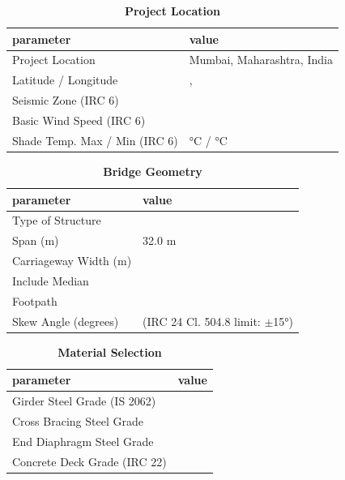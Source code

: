 \documentclass[12pt,a4paper]{report}
\numberwithin{table}{chapter}
\numberwithin{figure}{chapter}
\begin{document}
\begin{table}[H]
\caption{\textbf{Project Location}}
\label{subsec:project-location}
\begin{tabular}{|L{5.5cm}|L{8.5cm}|}
\hline
\textbf{parameter} & \textbf{value} \\
\hline
\textnormal{Project Location} & Mumbai, Maharashtra, India \\
\hline
\textnormal{Latitude / Longitude} & ,  \\
\hline
\textnormal{Seismic Zone (IRC 6)} &  \\
\hline
\textnormal{Basic Wind Speed (IRC 6)} &  \\
\hline
\textnormal{Shade Temp. Max / Min (IRC 6)} &  °C /  °C \\
\hline
\end{tabular}
\vspace{0.4cm}
\end{table}

\begin{table}[H]
\caption{\textbf{Bridge Geometry}}
\label{subsec:bridge-geometry}
\begin{tabular}{|L{5.5cm}|L{8.5cm}|}
\hline
\textbf{parameter} & \textbf{value} \\
\hline
\textnormal{Type of Structure} &  \\
\hline
\textnormal{Span (m)} & 32.0 m \\
\hline
\textnormal{Carriageway Width (m)} &  \\
\hline
\textnormal{Include Median} &  \\
\hline
\textnormal{Footpath} &  \\
\hline
\textnormal{Skew Angle (degrees)} &  (IRC 24 Cl. 504.8 limit: $\pm$15°) \\
\hline
\end{tabular}
\end{table}
\vspace{0.4cm}

\begin{table}[H]
\caption{\textbf{Material Selection}}
\label{subsec:material}
\begin{tabular}{|L{5.5cm}|L{8.5cm}|}
\hline
\textbf{parameter} & \textbf{value} \\
\hline
\textnormal{Girder Steel Grade (IS 2062)} &  \\
\hline
\textnormal{Cross Bracing Steel Grade} &  \\
\hline
\textnormal{End Diaphragm Steel Grade} &  \\
\hline
\textnormal{Concrete Deck Grade (IRC 22)} &  \\
\hline
\end{tabular}
\end{table}
\vspace{0.4cm}
\end{document}
